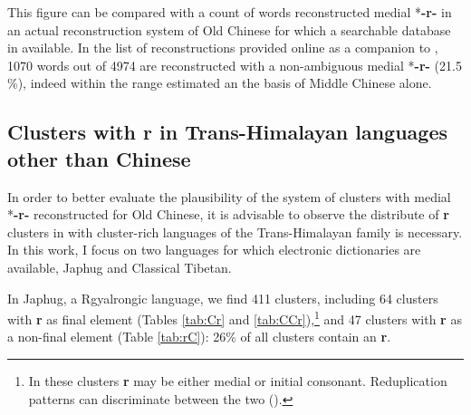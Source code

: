 \documentclass[oneside,a4paper,11pt]{article}
\newcommand{\ipa}[1]{{\phon\mbox{\textbf{#1}}}}
\begin{document}
This figure can be compared with a count of words reconstructed medial *\ipa{-r-} in an actual reconstruction system of Old Chinese for which a searchable database in available. In the list of reconstructions provided online as a companion to \citet{bs14oc}, 1070 words out of 4974 are reconstructed with a non-ambiguous medial *\ipa{-r-} (21.5 \%), indeed within the range estimated an the basis of Middle Chinese alone.

\subsection{Clusters with r in Trans-Himalayan languages other than Chinese}
In order to better evaluate the plausibility of the system of clusters with medial *\ipa{-r-} reconstructed for Old Chinese, it is advisable to observe the distribute of \ipa{r} clusters in  with cluster-rich languages of the Trans-Himalayan family is necessary. In this work, I focus on two languages for which electronic dictionaries are available, Japhug and Classical Tibetan.


In Japhug, a Rgyalrongic language, we find 411 clusters, including 64 clusters with \ipa{r} as final element (Tables \ref{tab:Cr} and \ref{tab:CCr}),\footnote{In these clusters \ipa{r} may be either medial or initial consonant. Reduplication patterns can discriminate between the two (\citealt{jacques07redupl}).} and 47 clusters with \ipa{r} as a non-final element (Table \ref{tab:rC}): 26\% of all clusters contain an \ipa{r}. 
\end{document}
